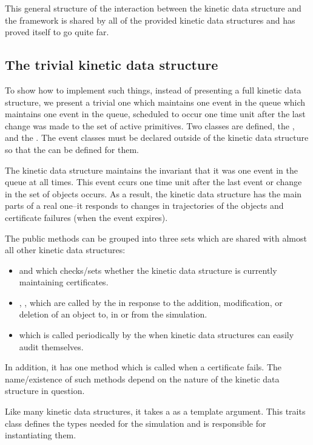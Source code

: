 This general structure of the interaction between the kinetic data
structure and the framework is shared by all of the provided kinetic
data structures and has proved itself to go quite far.

\subsection{The trivial kinetic data structure\label{sec:kds_trivial_example}}

To show how to implement such things, instead of presenting a full
kinetic data structure, we present a trivial one which maintains one
event in the queue which maintains one event in the queue, scheduled
to occur one time unit after the last change was made to the set of
active primitives.  Two classes are defined, the ,
and the . The event classes must be declared outside
of the kinetic data structure so that the  can be
defined for them.

The kinetic data structure maintains the invariant that it was one
event in the queue at all times. This event ccurs one time unit after
the last event or change in the set of objects occurs. As a result,
the kinetic data structure has the main parts of a real one--it
responds to changes in trajectories of the objects and certificate
failures (when the event expires).

 The public methods can be grouped into three sets which are shared
 with almost all other kinetic data structures:
\begin{itemize}
\item {} and  which
  checks/sets whether the kinetic data structure is currently
  maintaining certificates.
\item {}, ,  which are called by the
   in response to the
  addition, modification, or deletion of an object to, in or from the
  simulation.
\item {} which is called periodically by the
   when kinetic data structures can
  easily audit themselves.
\end{itemize} 

In addition, it has one method which is called when a certificate
fails. The name/existence of such methods depend on the nature of the
kinetic data structure in question.

Like many kinetic data structures, it takes a 
as a template argument. This traits class defines the types needed for
the simulation and is responsible for instantiating them.

